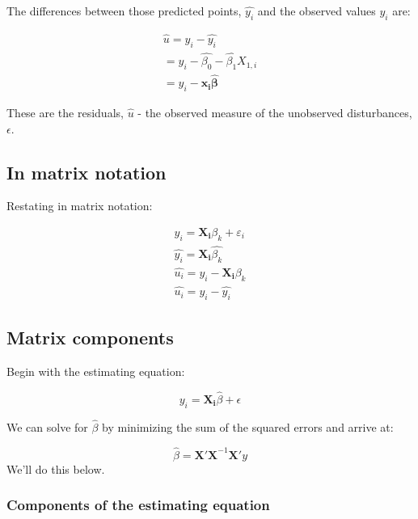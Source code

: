 \documentclass[
  letterpaper,
  DIV=11,
  numbers=noendperiod]{scrartcl}
\begin{document}
The differences between those predicted points, \(\widehat{y_{i}}\) and
the observed values \(y_i\) are:

\[
\begin{align}
  \widehat{u} = y_{i}-\widehat{y_{i}} \\ 
= y_{i}-\widehat{\beta_{0}}-\widehat{\beta_{1}}X_{1,i}\\
= y_{i}-\mathbf{x_i\widehat{\beta}}  \nonumber 
\end{align}
\]

These are the residuals, \(\widehat{u}\) - the observed measure of the
unobserved disturbances, \(\epsilon\).

\subsection{In matrix notation}\label{in-matrix-notation}

Restating in matrix notation:

\[
\begin{align}
y_{i} = \mathbf{X_i}  \beta_{k}  +\varepsilon_i \nonumber \\
\widehat{y_{i}}= \mathbf{X_i} \widehat{\beta_{k}}   \nonumber \\
\widehat{u_{i}} = y_i - \mathbf{X_i} \beta_k  \nonumber \\
\widehat{u_i} = y_i - \widehat{y_{i}}  \nonumber
\end{align}
\]

\subsection{Matrix components}\label{matrix-components}

Begin with the estimating equation:

\[
y_{i} = \mathbf{X_i}  \widehat{\beta}  +\epsilon \nonumber
\]

We can solve for \(\widehat{\beta}\) by minimizing the sum of the
squared errors and arrive at:

\[ \widehat{\beta} = \mathbf{X'X}^{-1} \mathbf{X'}y\] We'll do this
below.

\subsubsection{Components of the estimating
equation}\label{components-of-the-estimating-equation}
\end{document}
